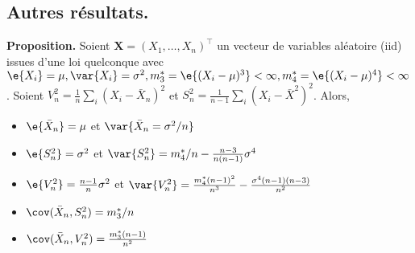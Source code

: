 \subsection{Autres résultats.}
\textbf{Proposition.} Soient $\boldsymbol{X}=(X_1,\dots,X_n)^\top$ un vecteur de variables aléatoire (iid) issues d'une loi quelconque avec $\e{X_i}=\mu, \var{X_i}=\sigma^2, m_3^*=\e{(X_i-\mu)^3} < \infty, m_4^*=\e{(X_i-\mu)^4} < \infty$. Soient $V^2_n=\frac{1}{n} \sum_i \left(X_i - \bar{X}_n \right)^2$ et $S^2_n = \frac{1}{n-1} \sum_i \left( X_i - \bar{X}^2 \right)^2$. Alors, 
\begin{itemize}
	\item $\e{\bar{X}_n}=\mu$ et $\var{\bar{X}_n=\sigma^2/n}$
	\item $\e{S_n^2}=\sigma^2$ et $\var{S_n^2}=m_4^*/n - \frac{n-3}{n(n-1)}\sigma^4$
	\item $\e{V_n^2}=\frac{n-1}{n}\sigma^2$ et $\var{V_n^2}=\frac{m^*_4(n-1)^2}{n^3} - \frac{\sigma^4(n-1)(n-3)}{n^2}$
	\item $\cov(\bar{X}_n,S^2_n)=m^*_3/n$
	\item $\cov(\bar{X}_n,V^2_n)=\frac{m^*_3(n-1)}{n^2}$
\end{itemize}